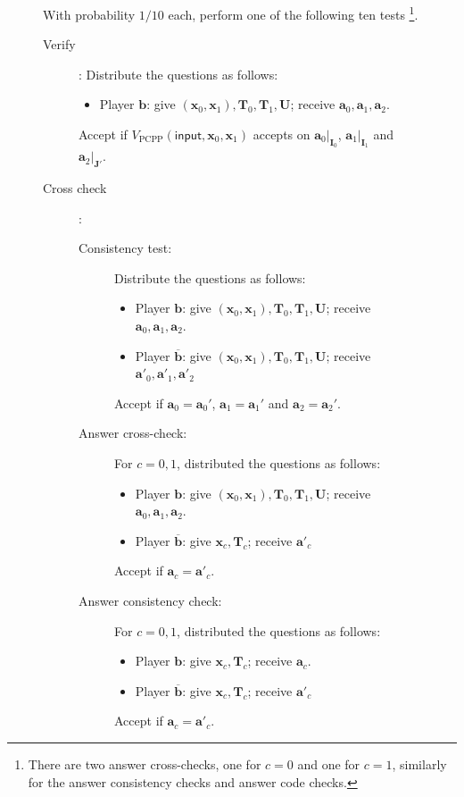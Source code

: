 \documentclass[11pt]{article}
\theoremstyle{plain}
\theoremstyle{definition}
\newenvironment{Algorithm}{\begin{framed}}{\end{framed}}
\newcommand{\1}{\mathbb{1}} %
\newcommand{\ba}{\pmb{a}}
\newcommand{\bb}{\pmb{b}}
\newcommand{\bx}{\pmb{x}}
\newcommand{\bI}{\pmb{I}}
\newcommand{\bJ}{\pmb{J}}
\newcommand{\bT}{\pmb{T}}
\newcommand{\bU}{\pmb{U}}
\newcommand{\PCPP}{\mathrm{PCPP}}
\newcommand{\ipt}{\mathsf{input}}
\begin{document}
\begin{figure}
\begin{center}
{\begin{minipage}{0.9\linewidth}
\begin{Algorithm}
            With probability $1/10$ each, perform one of the following ten tests
            \footnote{There are two answer cross-checks, one for $c=0$ and one for $c=1$, similarly for the 
            answer consistency checks and answer code checks.}.
    \begin{description}
    	\item[Verify]: Distribute the questions as follows:
    		\begin{itemize}
    		\item
    		Player $\bb$: give $(\bx_0, \bx_1), \bT_0, \bT_1, \bU$; receive $\ba_0, \ba_1, \ba_2$.
    		\end{itemize}
    	Accept if $V_{\PCPP}(\ipt, \bx_0, \bx_1)$ accepts on $\ba_0|_{\bI_0}$, $\ba_1|_{\bI_1}$ and $\ba_2|_{\bJ'}$.
    	\item[Cross check]: 
    	\begin{description}
    		\item[Consistency test:] Distribute the questions as follows:
    		\begin{itemize}
    		\item
    		Player $\bb$: give $(\bx_0, \bx_1), \bT_0, \bT_1, \bU$; receive $\ba_0, \ba_1, \ba_2$.
    		\item
    		Player $\overline{\bb}$: give $(\bx_0, \bx_1), \bT_0, \bT_1, \bU$; receive $\ba'_0, \ba'_1, \ba'_2$
    		\end{itemize}
    		Accept if $\ba_0 = \ba_0'$, $\ba_1 = \ba_1'$ and $\ba_2 = \ba_2'$.
    		\item[Answer cross-check:] For $c=0,1$, distributed the questions as follows:
    		\begin{itemize}
    		\item
    		Player $\bb$: give $(\bx_0, \bx_1), \bT_0, \bT_1, \bU$; receive $\ba_0, \ba_1, \ba_2$.
    		\item
    		Player $\overline{\bb}$: give $\bx_{c}, \bT_{c}$; receive $\ba'_{c}$
    		\end{itemize}
    		Accept if $\ba_{c} = \ba'_{c}$.
    		\item[Answer consistency check:] For $c = 0, 1$, distributed the questions as follows:
    		\begin{itemize}
    		\item
    		Player $\bb$: give $\bx_{c}, \bT_{c}$; receive $\ba_{c}$.
    		\item
    		Player $\overline{\bb}$: give $\bx_{c}, \bT_{c}$; receive $\ba'_{c}$
    		\end{itemize}
    		Accept if $\ba_{c} = \ba'_{c}$.

\end{description}
\end{description}
\end{Algorithm}
\end{minipage}}
\end{center}
\end{figure}
\end{document}
